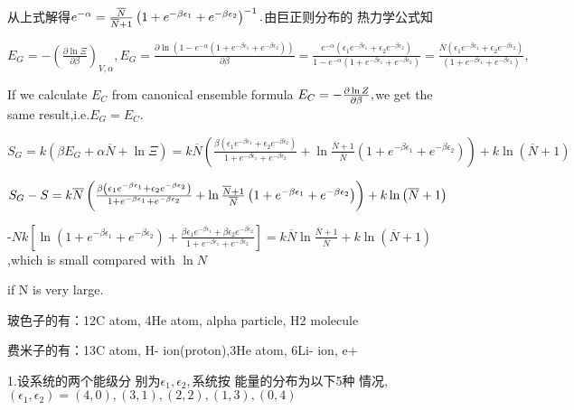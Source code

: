 \documentclass{ctexart}
\begin{document}
从上式解得$e^{-\alpha }=\frac{\overline{N}}{%
\overline{N}+1}\left( 1+e^{-\beta \epsilon _{1}}+e^{-\beta \epsilon
_{2}}\right) ^{-1}.$由巨正则分布的%
热力学公式知

$E_{G}=-\left( \frac{\partial \ln \Xi }{\partial \beta }\right) _{V,\alpha
},E_{G}=\frac{\partial \ln \left( 1-e^{-\alpha }\left( 1+e^{-\beta \epsilon
_{1}}+e^{-\beta \epsilon _{2}}\right) \right) }{\partial \beta }=\allowbreak 
\frac{e^{-\alpha }\left( \epsilon _{1}e^{-\beta \epsilon _{1}}+\epsilon
_{2}e^{-\beta \epsilon _{2}}\right) }{1-e^{-\alpha }\left( 1+e^{-\beta
\epsilon _{1}}+e^{-\beta \epsilon _{2}}\right) }\allowbreak \allowbreak =%
\frac{\overline{N}\left( \epsilon _{1}e^{-\beta \epsilon _{1}}+\epsilon
_{2}e^{-\beta \epsilon _{2}}\right) }{\left( 1+e^{-\beta \epsilon
_{1}}+e^{-\beta \epsilon _{2}}\right) },$

If we calculate $E_{C}$ from canonical ensemble formula $E_{C}=-\frac{%
\partial \ln Z}{\partial \beta },$we get the same result,i.e.$%
E_{G}\allowbreak =E_{C}.$

$S_{G}=k\left( \beta E_{G}+\alpha \overline{N}+\ln \Xi \right) =k\overline{N}%
\left( \frac{\beta \left( \epsilon _{1}e^{-\beta \epsilon _{1}}+\epsilon
_{2}e^{-\beta \epsilon _{2}}\right) }{1+e^{-\beta \epsilon _{1}}+e^{-\beta
\epsilon _{2}}}+\ln \frac{\overline{N}+1}{\overline{N}}\left( 1+e^{-\beta
\epsilon _{1}}+e^{-\beta \epsilon _{2}}\right) \right) +k\ln \left( 
\overline{N}+1\right) $

$S_{G}-S=k\overline{N}\left( \frac{\beta \left( \epsilon _{1}e^{-\beta
\epsilon _{1}}+\epsilon _{2}e^{-\beta \epsilon _{2}}\right) }{1+e^{-\beta
\epsilon _{1}}+e^{-\beta \epsilon _{2}}}+\ln \frac{\overline{N}+1}{\overline{%
N}}\left( 1+e^{-\beta \epsilon _{1}}+e^{-\beta \epsilon _{2}}\right) \right)
+k\ln \left( \overline{N}+1\right) $

-$Nk\left[ \ln \left( 1+e^{-\beta \epsilon _{1}}+e^{-\beta \epsilon
_{2}}\right) +\frac{\beta \epsilon _{1}e^{-\beta \epsilon _{1}}+\beta
\epsilon _{2}e^{-\beta \epsilon _{2}}}{1+e^{-\beta \epsilon _{1}}+e^{-\beta
\epsilon _{2}}}\right] =k\overline{N}\ln \frac{\overline{N}+1}{\overline{N}}%
+k\ln \left( \overline{N}+1\right) $,which is small compared with $\ln N$

if N is very large.

玻色子的有：12C atom, 4He atom, alpha
particle, H2 molecule

费米子的有：13C atom, H- ion(proton),3He
atom, 6Li- ion, e+


1.设系统的两个能级分%
别为$\epsilon _{1},\epsilon _{2},$系统按%
能量的分布为以下5种%
情况,$\left( \epsilon _{1},\epsilon _{2}\right) =\left(
4,0\right) ,\left( 3,1\right) ,\left( 2,2\right) ,\left( 1,3\right) ,\left(
0,4\right) $
\end{document}
